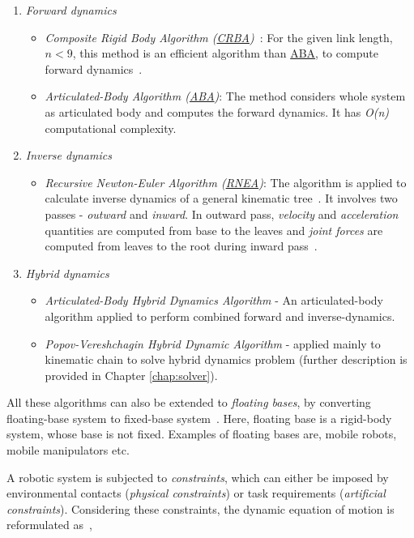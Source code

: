 \begin{enumerate}
	\item \textit{Forward dynamics}
	\begin{itemize}
		\item \textit{Composite Rigid Body Algorithm (\hyperref[crba]{CRBA})}~\cite{walker1982efficient}: For the given link length, $n < 9$, this method is an efficient algorithm than \hyperref[aba]{ABA}, to compute forward dynamics~\cite{featherstone2000robot}. 
		\item  \textit{Articulated-Body Algorithm (\hyperref[aba]{ABA})}: The method considers whole system as articulated body and computes the forward dynamics. It has \textit{O(n)} computational complexity.
	\end{itemize}
	\item \textit{Inverse dynamics}
	\begin{itemize}
		\item \textit{Recursive Newton-Euler Algorithm (\hyperref[rnea]{RNEA})}: The algorithm is applied to calculate inverse dynamics of a general kinematic tree~\cite{featherstone2000robot}. It involves two passes - \textit{outward} and \textit{inward}. In outward pass, \textit{velocity} and \textit{acceleration} quantities are computed from base to the leaves and \textit{joint forces} are computed from leaves to the root during inward pass~\cite{featherstone2014rigid}. 
	\end{itemize}
	\item \textit{Hybrid dynamics}
	\begin{itemize}
		\item \textit{Articulated-Body Hybrid Dynamics Algorithm} - An articulated-body algorithm applied to perform combined forward and inverse-dynamics. 
		\item \textit{Popov-Vereshchagin Hybrid Dynamic Algorithm} - applied mainly to kinematic chain to solve hybrid dynamics problem (further description is provided in Chapter \ref{chap:solver}).  
	\end{itemize}
	
\end{enumerate}

All these algorithms can also be extended to \textit{floating bases}, by converting floating-base system to fixed-base system~\cite{featherstone2014rigid}. Here, floating base is a rigid-body system, whose base is not fixed. Examples of floating bases are, mobile robots, mobile manipulators etc. 

A robotic system is subjected to \textit{constraints}, which can either be imposed by environmental contacts (\textit{physical constraints}) or task requirements (\textit{artificial constraints}). Considering these constraints, the dynamic equation of motion is reformulated as~\cite{shakhimardanov2015composable},

